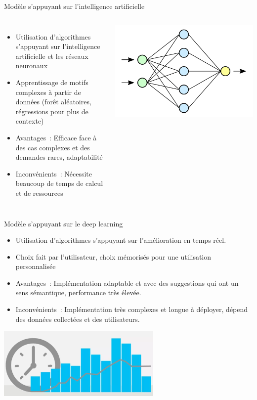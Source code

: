 \begin{frame}{Modèle s'appuyant sur l'intelligence artificielle}
    \begin{columns}
     \begin{itemize}
		\item Utilisation d'algorithmes s'appuyant sur l'intelligence artificielle et les réseaux neuronaux
            \item Apprentissage de motifs complexes à partir de données (forêt aléatoires, régressions pour plus de contexte)
		\item Avantages~: Efficace face à des cas complexes et des demandes rares, adaptabilité
		\item Inconvénients~: Nécessite beaucoup de temps de calcul et de ressources
    \end{itemize}
        \includegraphics[width=\textwidth]{images/intelligence.png}
    \end{columns}
\end{frame}


\begin{frame}{Modèle s'appuyant sur le deep learning}
	\begin{itemize}
		\item Utilisation d'algorithmes s'appuyant sur l'amélioration en temps réel.
            \item Choix fait par l'utilisateur, choix mémorisés pour une utilisation personnalisée
		\item Avantages~: Implémentation adaptable et avec des suggestions qui ont un sens sémantique, performance très élevée.
		\item Inconvénients~: Implémentation très complexes et longue à déployer, dépend des données collectées et des utilisateurs.
	\end{itemize}
        \begin{center}
			\includegraphics[width=0.6\textwidth]{images/learning.png}
	\end{center}
\end{frame}
